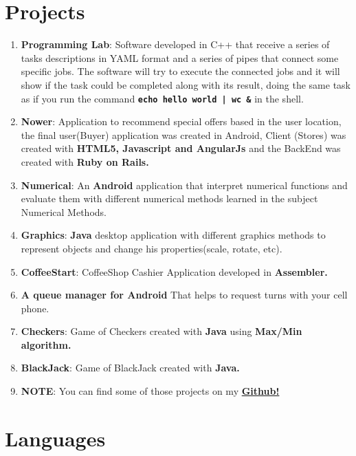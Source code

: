 \documentclass[a4paper,10pt]{article} %
\begin{document}
\section{Projects}
\begin{enumerate}
\item \textbf{Programming Lab}: Software developed in C++ that receive a series of tasks descriptions in YAML format and a series of pipes that connect some specific jobs. The software will try to execute the connected jobs and it will show if the task could be completed along with its result, doing the same task as if you run the command \textbf{\texttt{echo hello world | wc \&}} in the shell.
\item \textbf{Nower}: Application to recommend special offers based in the user location, the final user(Buyer) application was created in Android, Client (Stores) was created with \textbf{HTML5, Javascript and AngularJs} and the BackEnd was created with \textbf{Ruby on Rails.}
\item \textbf{Numerical}: An \textbf{Android} application that interpret numerical functions and evaluate them with different numerical methods learned in the subject Numerical Methods.
\item \textbf{Graphics}: \textbf{Java} desktop application with different graphics methods to represent objects and change his properties(scale, rotate, etc).
\item \textbf{CoffeeStart}: CoffeeShop Cashier Application developed in \textbf{Assembler.}
\item \textbf{A queue manager for Android} That helps to request turns with your cell phone.
\item \textbf{Checkers}:  Game of Checkers created with \textbf{Java} using \textbf{Max/Min algorithm.}
\item \textbf{BlackJack}: Game of BlackJack created with \textbf{Java.}
\item \textbf{NOTE}: You can find some of those projects on my \href{https://github.com/EstebanFS}{\textbf{Github!}}
\end{enumerate}



\section{Languages}
\end{document}
